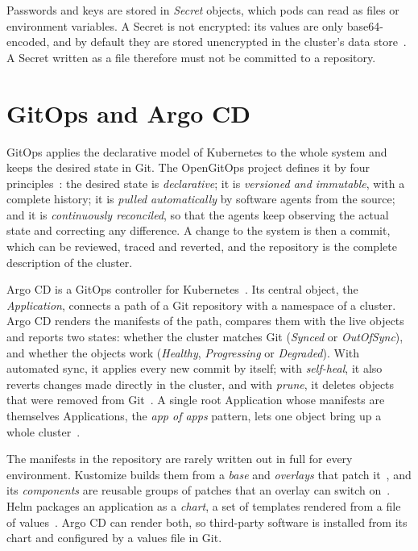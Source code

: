 Passwords and keys are stored in \emph{Secret} objects, which pods can read as files or environment variables. A Secret is not encrypted: its values are only base64-encoded, and by default they are stored unencrypted in the cluster's data store~\cite{K8sSecrets}. A Secret written as a file therefore must not be committed to a repository.

\section{GitOps and Argo CD}
\label{sec:BgGitOps}
GitOps applies the declarative model of Kubernetes to the whole system and keeps the desired state in Git. The OpenGitOps project defines it by four principles~\cite{OpenGitOps}: the desired state is \emph{declarative}; it is \emph{versioned and immutable}, with a complete history; it is \emph{pulled automatically} by software agents from the source; and it is \emph{continuously reconciled}, so that the agents keep observing the actual state and correcting any difference. A change to the system is then a commit, which can be reviewed, traced and reverted, and the repository is the complete description of the cluster.

Argo CD is a GitOps controller for Kubernetes~\cite{ArgoCD}. Its central object, the \emph{Application}, connects a path of a Git repository with a namespace of a cluster. Argo CD renders the manifests of the path, compares them with the live objects and reports two states: whether the cluster matches Git (\emph{Synced} or \emph{OutOfSync}), and whether the objects work (\emph{Healthy}, \emph{Progressing} or \emph{Degraded}). With automated sync, it applies every new commit by itself; with \emph{self-heal}, it also reverts changes made directly in the cluster, and with \emph{prune}, it deletes objects that were removed from Git~\cite{ArgoCDAutoSync}. A single root Application whose manifests are themselves Applications, the \emph{app of apps} pattern, lets one object bring up a whole cluster~\cite{ArgoCDBootstrap}.

The manifests in the repository are rarely written out in full for every environment. Kustomize builds them from a \emph{base} and \emph{overlays} that patch it~\cite{KustomizePatches}, and its \emph{components} are reusable groups of patches that an overlay can switch on~\cite{KustomizeComponents}. Helm packages an application as a \emph{chart}, a set of templates rendered from a file of values~\cite{Helm}. Argo CD can render both, so third-party software is installed from its chart and configured by a values file in Git.

